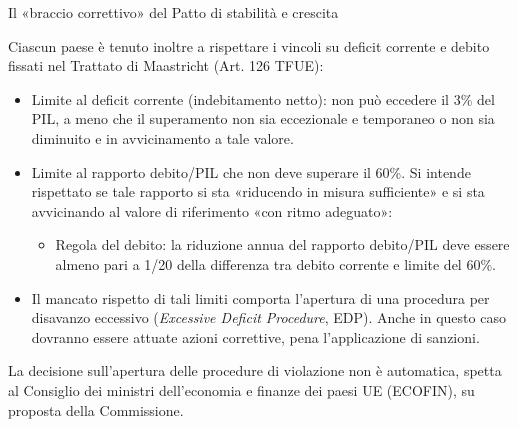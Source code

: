 \documentclass[aspectratio=64,11pt]{beamer}
\begin{document}
\begin{frame}{Il «braccio correttivo» del Patto di stabilità e crescita}

  Ciascun paese è tenuto inoltre a rispettare i vincoli su deficit corrente e
  debito fissati nel Trattato di Maastricht (Art. 126 TFUE):
  \begin{itemize}
  \item \alert{Limite al deficit corrente} (indebitamento netto): non può
    eccedere il 3\% del PIL, a meno che il superamento non sia eccezionale e
    temporaneo o non sia diminuito e in avvicinamento a tale valore.
  \item \alert{Limite al rapporto debito/PIL} che non deve superare il
    60\%. Si intende rispettato se tale rapporto si sta «riducendo in misura
    sufficiente» e si sta avvicinando al valore di riferimento «con ritmo
    adeguato»:
    \begin{itemize}
    \item \alert{Regola del debito}: la riduzione annua del rapporto
      debito/PIL deve essere almeno pari a 1/20 della differenza tra debito
      corrente e limite del 60\%.
    \end{itemize}
  \item Il mancato rispetto di tali limiti comporta l'apertura di una
    \alert{procedura per disavanzo eccessivo} (\emph{Excessive Deficit
      Procedure}, EDP). Anche in questo caso dovranno essere attuate azioni
    correttive, pena l'applicazione di sanzioni.
  \end{itemize}
  \begin{block}{}
    \small La decisione sull'apertura delle procedure di violazione non è
    automatica, spetta al Consiglio dei ministri dell'economia e finanze dei
    paesi UE (ECOFIN), su proposta della Commissione.
  \end{block}
\end{frame}
\end{document}
